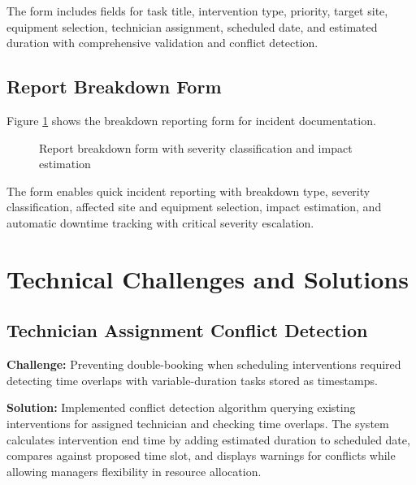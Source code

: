 The form includes fields for task title, intervention type, priority, target site, equipment selection, technician assignment, scheduled date, and estimated duration with comprehensive validation and conflict detection.

\subsection{Report Breakdown Form}

Figure \ref{fig:sprint3-impl4} shows the breakdown reporting form for incident documentation.

\begin{figure}[H]
\centering
{}
\caption{Report breakdown form with severity classification and impact estimation}
\label{fig:sprint3-impl4}
\end{figure}

The form enables quick incident reporting with breakdown type, severity classification, affected site and equipment selection, impact estimation, and automatic downtime tracking with critical severity escalation.

\section{Technical Challenges and Solutions}

\subsection{Technician Assignment Conflict Detection}

\textbf{Challenge:} Preventing double-booking when scheduling interventions required detecting time overlaps with variable-duration tasks stored as timestamps.

\textbf{Solution:} Implemented conflict detection algorithm querying existing interventions for assigned technician and checking time overlaps. The system calculates intervention end time by adding estimated duration to scheduled date, compares against proposed time slot, and displays warnings for conflicts while allowing managers flexibility in resource allocation.

